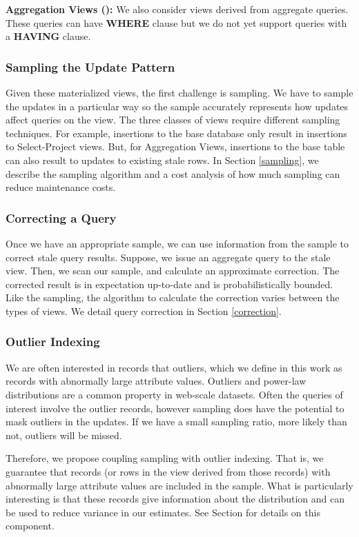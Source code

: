 \vspace{1em}

\noindent\textbf{Aggregation Views (\aggview): } We also consider views derived from aggregate queries. These queries can have \textbf{WHERE} clause but we do not yet support queries with a \textbf{HAVING} clause.

\subsubsection{Sampling the Update Pattern}
Given these materialized views, the first challenge is sampling.
We have to sample the updates in a particular way so the sample accurately represents how updates
affect queries on the view. 
The three classes of views require different sampling techniques.
For example, insertions to the base database only result in insertions to Select-Project views.
But, for Aggregation Views, insertions to the base table can also result to updates to existing stale rows.
In Section \ref{sampling}, we describe the sampling algorithm and a cost analysis of how much sampling can reduce maintenance costs.

\subsubsection{Correcting a Query}
Once we have an appropriate sample, we can use information from the sample to correct stale query results.
Suppose, we issue an aggregate query to the stale view.
Then, we scan our sample, and calculate an approximate correction.
The corrected result is in expectation up-to-date and is probabilistically bounded.
Like the sampling, the algorithm to calculate the correction varies between the types of views.
We detail query correction in Section \ref{correction}.

\subsubsection{Outlier Indexing}
We are often interested in records that outliers, 
which we define in this work as records with abnormally large attribute values.
Outliers and power-law distributions are a common property in web-scale datasets.
Often the queries of interest involve the outlier records, however sampling does 
have the potential to mask outliers in the updates.
If we have a small sampling ratio, more likely than not, outliers will be missed.

Therefore, we propose coupling sampling with outlier indexing. 
That is, we guarantee that records (or rows in the view derived from those records) 
with abnormally large attribute values are included in the sample.
What is particularly interesting is that these records give information about the distribution 
and can be used to reduce variance in our estimates.
See Section \label{outlier} for details on this component.

